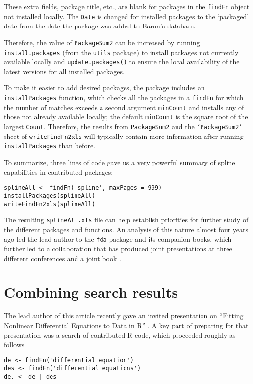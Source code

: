 These extra fields, package title, etc., are blank for
packages in the {\tt findFn} object not installed locally.
The {\tt Date} is changed for installed packages
to the `packaged' date from the date the
package was added to Baron's database.

Therefore, the value of {\tt PackageSum2} can be
increased by running {\tt install.packages} (from the
{\tt utils} package) to install packages not currently
available locally and {\tt update.packages()} to ensure the
local availability of the latest versions for all
installed packages.

To make it easier to add desired packages,
the  package includes
an {\tt installPackages} function, which checks all the
packages in a {\tt findFn} for which
the number of matches exceeds a second argument {\tt minCount}
and installs any of those not already available locally;  the
default {\tt minCount} is the square root of the largest
{\tt Count}.  Therefore, the results from {\tt PackageSum2} and the
{\tt `PackageSum2'} sheet of {\tt writeFindFn2xls} will typically
contain more information after running {\tt installPackages}
than before.

To summarize, three lines of code gave us a very powerful
summary of spline capabilities in contributed \R{}
packages:

\begin{verbatim}
splineAll <- findFn('spline', maxPages = 999)
installPackages(splineAll)
writeFindFn2xls(splineAll)
\end{verbatim}

The resulting {\tt splineAll.xls} file can help establish priorities
for further study of the different packages and functions.  An
analysis of this nature almost four years ago led the lead author
to the {\tt fda} package and its companion books, which further
led to a collaboration that has produced joint presentations at
three different conferences and a joint book \citep{RHG09}.


\section{Combining search results}

The lead author of this article recently gave an invited presentation
on ``Fitting Nonlinear Differential Equations to Data in R'' \citep{GHR09}.
A key part of preparing for that presentation was a search of
contributed R code, which proceeded roughly as follows:

\begin{verbatim}
de <- findFn('differential equation')
des <- findFn('differential equations')
de. <- de | des
\end{verbatim}

